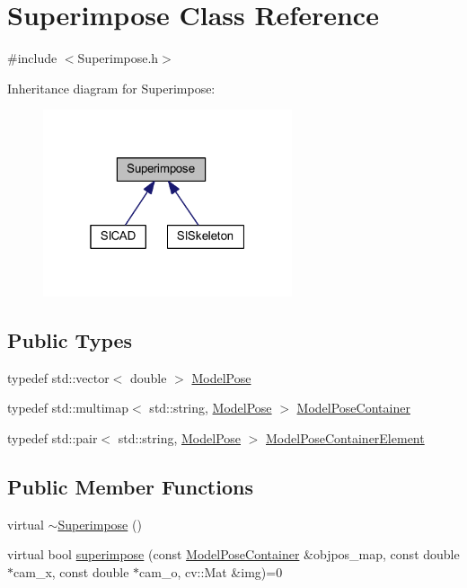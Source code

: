 \hypertarget{classSuperimpose}{}\section{Superimpose Class Reference}
\label{classSuperimpose}


{\ttfamily \#include $<$Superimpose.\+h$>$}



Inheritance diagram for Superimpose\+:\nopagebreak
\begin{figure}[H]
\begin{center}
\leavevmode
\includegraphics[width=208pt]{classSuperimpose__inherit__graph}
\end{center}
\end{figure}
\subsection*{Public Types}
\begin{DoxyCompactItemize}
\item 
typedef std\+::vector$<$ double $>$ \mbox{\hyperlink{classSuperimpose_a85d40a5caf19f486d1e0c15c0a025378}{Model\+Pose}}
\item 
typedef std\+::multimap$<$ std\+::string, \mbox{\hyperlink{classSuperimpose_a85d40a5caf19f486d1e0c15c0a025378}{Model\+Pose}} $>$ \mbox{\hyperlink{classSuperimpose_a178e3d4e2def6635bfcf9454dd4b5d22}{Model\+Pose\+Container}}
\item 
typedef std\+::pair$<$ std\+::string, \mbox{\hyperlink{classSuperimpose_a85d40a5caf19f486d1e0c15c0a025378}{Model\+Pose}} $>$ \mbox{\hyperlink{classSuperimpose_a1e02e0225687b42296dcfee4eadf8a55}{Model\+Pose\+Container\+Element}}
\end{DoxyCompactItemize}
\subsection*{Public Member Functions}
\begin{DoxyCompactItemize}
\item 
virtual \mbox{\hyperlink{classSuperimpose_a9e32031994dc105b1572e7a6db26b41b}{$\sim$\+Superimpose}} ()
\item 
virtual bool \mbox{\hyperlink{classSuperimpose_a62c4c269b8fc34cc36d3d54fa4acb35c}{superimpose}} (const \mbox{\hyperlink{classSuperimpose_a178e3d4e2def6635bfcf9454dd4b5d22}{Model\+Pose\+Container}} \&objpos\+\_\+map, const double $\ast$cam\+\_\+x, const double $\ast$cam\+\_\+o, cv\+::\+Mat \&img)=0
\end{DoxyCompactItemize}


